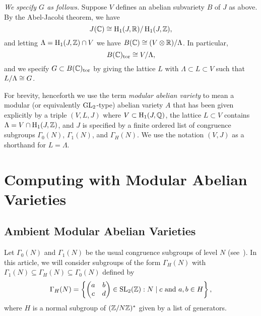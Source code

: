 \documentclass{article}
\begin{document}
	{\em We specify $G$ as follows.}
Suppose $V$ defines an abelian subvariety $B$ of $J$ as above.
By the Abel-Jacobi theorem, we have
$$
	J(\mathbb{C}) \cong \operatorname{H}_1(J, \mathbb{R}) / \operatorname{H}_1(J,\mathbb{Z}),
$$
and letting $\Lambda = \operatorname{H}_1(J,\mathbb{Z}) \cap V$ we have
$B(\mathbb{C}) \cong (V\otimes\mathbb{R}) / \Lambda$.
In particular,
$$
	B(\mathbb{C})_{\operatorname{tor}} \cong V/\Lambda,
$$
and we specify $G\subset B(\mathbb{C})_{\operatorname{tor}}$ by giving the lattice $L$ with
$\Lambda \subset L\subset V$ such that $L/\Lambda \cong G$.


For brevity, henceforth we use the term {\em modular abelian variety}
to mean a modular (or equivalently $\operatorname{GL}_2$-type) abelian variety $A$
that has been given explicitly by a triple $(V,L,J)$ where $V\subset
	\operatorname{H}_1(J,\mathbb{Q})$, the lattice $L\subset V$ contains $\Lambda = V\cap
	\operatorname{H}_1(J,\mathbb{Z})$, and $J$ is specified by a finite ordered list of
congruence subgroups $\Gamma_0(N)$, $\Gamma_1(N)$, and $\Gamma_H(N)$.
We use the notation $(V,J)$ as a shorthand for $L=\Lambda$.



\section{Computing with Modular Abelian Varieties}

\subsection{Ambient Modular Abelian Varieties}
\label{sec:amb_modabvar}

Let $\Gamma_0(N)$ and $\Gamma_1(N)$ be the usual congruence subgroups of level
$N$ (see~\cite{stein:modform}). In this article, we will consider subgroups of
the form $\Gamma_H(N)$ with $\Gamma_1(N)\subseteq \Gamma_H(N)\subseteq
	\Gamma_0(N)$ defined by
\[
	\Gamma_H(N) =
	\left\{
	\begin{pmatrix}
		a & b \\
		c & d
	\end{pmatrix}
	\in \operatorname{SL}_2(\mathbb{Z}) :
	N\mid c \text{ and } a,b\in H
	\right\},
\]
where $H$ is a normal subgroup of $(\mathbb{Z}/N\mathbb{Z})^*$ given by a list of generators.
\end{document}
